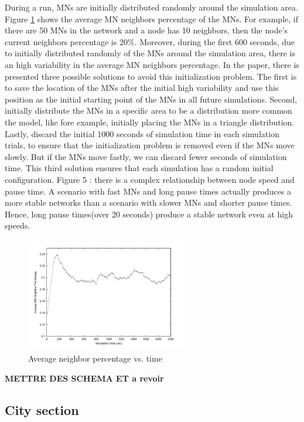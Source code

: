 During a run, MNs are initially distributed randomly around the simulation area. Figure \ref{RandomWaypointFig2} shows the average MN neighbors percentage of the MNs. For example, if there are 50 MNs in the network and a node has 10 neighbors, then the node's current neighbors percentage is 20\%. Moreover, during the first 600 seconds, due to initially distributed randomly of the MNs around the simulation area, there is an high variability in the average MN neighbors percentage.
In the paper, there is presented three possible solutions to avoid this initialization problem. The first is to save the location of the MNs after the initial high variability and use this position as the initial starting point of the MNs in all future simulations. Second, initially distribute the MNs in a specific area to be a distribution more common the model, like fore example, initially placing the MNs in a triangle distribution. Lastly, discard the initial 1000 seconds of simulation time in each simulation trials, to ensure that the initialization problem is removed even if the MNs move slowly. But if the MNs move fastly, we can discard fewer seconds of simulation time. This third solution ensures that each simulation has a random initial configuration.
Figure 5 : there is a complex relationship between node speed and pause time. A scenario with fast MNs and long pause times actually produces a more stable networks than a scenario with slower MNs and shorter pause times. Hence, long pause times(over 20 seconds) produce a stable network even at high speeds.

\begin{figure}[h]
\center
\includegraphics[width=7cm,height=50mm]{../images/randomwaypoint2.png}
\caption{\label{RandomWaypointFig2}Average neighbor percentage vs. time}
\end{figure}

\textbf{METTRE DES SCHEMA ET a revoir}

\subsection{City section}

